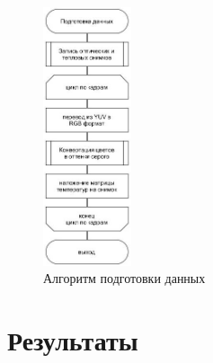\documentclass[t]{beamer}
\begin{document}
	\begin{frame}
		
		\begin{figure}[h!]
			\centering
			\includegraphics[width = 0.23\textwidth]{image/chapter_2/fullprepare}	
			\caption{Алгоритм подготовки данных}
			\label{fig:fullprepare}
		\end{figure}
		
	\end{frame}

\section{Результаты}
\end{document}
